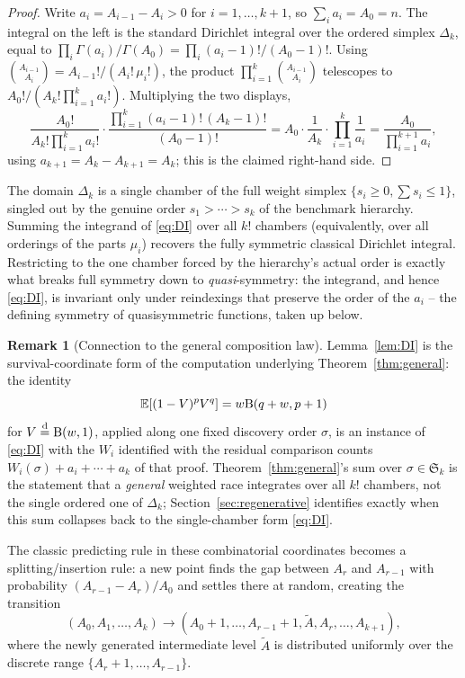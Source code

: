 \documentclass[11pt]{article}
\newcommand{\EE}{\mathbb{E}}
\theoremstyle{plain}
\theoremstyle{definition}
\newtheorem{remark}[theorem]{Remark}
\begin{document}
\begin{proof}
Write \(a_i=A_{i-1}-A_i>0\) for \(i=1,\ldots,k+1\), so \(\sum_i a_i=A_0=n\). The integral on the left is the standard Dirichlet integral over the ordered simplex \(\Delta_k\), equal to \(\prod_i\Gamma(a_i)/\Gamma(A_0)=\prod_i(a_i-1)!/(A_0-1)!\). Using \(\binom{A_{i-1}}{A_i}=A_{i-1}!/(A_i!\,\mu_i!)\), the product \(\prod_{i=1}^k\binom{A_{i-1}}{A_i}\) telescopes to \(A_0!/(A_k!\prod_{i=1}^k a_i!)\). Multiplying the two displays,
\[
\frac{A_0!}{A_k!\prod_{i=1}^k a_i!}\cdot\frac{\prod_{i=1}^k(a_i-1)!\,(A_k-1)!}{(A_0-1)!}
=A_0\cdot\frac1{A_k}\cdot\prod_{i=1}^k\frac1{a_i}
=\frac{ A_0} {\prod_{i=1}^{k+1}a_i},
\]
using \(a_{k+1}=A_k-A_{k+1}=A_k\); this is the claimed right-hand side.
\end{proof}





The domain \(\Delta_k\) is a single chamber of the full weight simplex \(\{s_i\ge0,\sum s_i\le1\}\), singled out by the genuine order \(s_1>\cdots>s_k\) of the benchmark hierarchy. Summing the integrand of \eqref{eq:DI} over all \(k!\) chambers (equivalently, over all orderings of the parts \(\mu_i\)) recovers the fully symmetric classical Dirichlet integral. Restricting to the one chamber forced by the hierarchy's actual order is exactly what breaks full symmetry down to \emph{quasi}-symmetry: the integrand, and hence \eqref{eq:DI}, is invariant only under reindexings that preserve the order of the \(a_i\) -- the defining symmetry of quasisymmetric functions, taken up below.

\begin{remark}[Connection to the general composition law]
\label{rem:DI-general}
Lemma~\ref{lem:DI} is the survival-coordinate form of the computation underlying Theorem~\ref{thm:general}: the identity 
$$\EE[(1-V)^pV^q]=w {\rm B}(q+w,p+1)$$ 
for \(V\stackrel{\rm d}{=}{\rm B}(w,1)\),
applied along one fixed discovery order \(\sigma\), is an
 instance of \eqref{eq:DI} with the \(W_i\) identified with the residual comparison counts \(W_i(\sigma)+a_i+\cdots+a_k\) of that proof. Theorem~\ref{thm:general}'s sum over \(\sigma\in\mathfrak S_k\) is  the statement that a \emph{general} weighted race integrates over all \(k!\) chambers, not the single ordered one of \(\Delta_k\); Section~\ref{sec:regenerative} identifies exactly when this sum collapses back to the single-chamber form \eqref{eq:DI}.
\end{remark}

The classic predicting rule in these combinatorial coordinates becomes a splitting/insertion rule: a new point finds the gap between \(A_r\) and \(A_{r-1}\) with probability \((A_{r-1}-A_r)/A_0\) and settles there at random, creating the transition
\begin{equation}
(A_0,A_1,\ldots, A_k) \longrightarrow (A_0+1, \ldots, A_{r-1}+1, \widetilde{A},  A_r,\ldots,A_{k+1}),
\end{equation}
where the newly generated intermediate level \(\widetilde{A}\) is distributed uniformly over the discrete range \(\{A_r+1,\ldots,A_{r-1}\}\).
\end{document}
